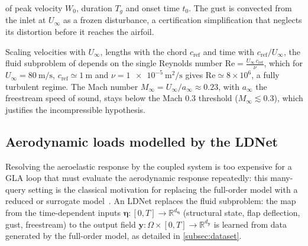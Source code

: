 of peak velocity $W_0$, duration $T_g$ and onset time $t_0$. The gust is convected from the inlet at $U_\infty$ as a frozen disturbance, a certification simplification that neglects its distortion before it reaches the airfoil.

Scaling velocities with $U_\infty$, lengths with the chord $c_{\mathrm{ref}}$ and time with $c_{\mathrm{ref}}/U_\infty$, the fluid subproblem of  depends on the single Reynolds number $\mathrm{Re} = \frac{U_\infty\,c_{\mathrm{ref}}}{\nu}$, which for $U_\infty=\SI{80}{\meter\per\second}$, $c_{\mathrm{ref}}\simeq\SI{1}{\meter}$ and $\nu=\SI{1e-5}{\meter\squared\per\second}$ gives $\mathrm{Re}\simeq8\times10^{6}$, a fully turbulent regime. The Mach number $M_\infty=U_\infty/a_\infty\approx0.23$, with $a_\infty$ the freestream speed of sound, stays below the Mach $0.3$ threshold ($M_\infty\lesssim0.3$), which justifies the incompressible hypothesis.

\subsection{Aerodynamic loads modelled by the LDNet}
\label{subsec:ldnet_arch}

Resolving the aeroelastic response by the coupled system  is too expensive for a GLA loop that must evaluate the aerodynamic response repeatedly: this many-query setting is the classical motivation for replacing the full-order model with a reduced or surrogate model~\cite{BennerGugercinWillcox2015,QuarteroniManzoniNegri2016}. An LDNet replaces the fluid subproblem: the map from the time-dependent inputs $\boldsymbol{\eta}: [0,T] \to \mathbb{R}^{d_{\boldsymbol{\eta}}}$ (structural state, flap deflection, gust, freestream) to the output field $\mathbf{y}: \Omega \times [0,T] \to \mathbb{R}^{d_{\mathbf{y}}}$ is learned from data generated by the full-order model, as detailed in \cref{subsec:dataset}.

